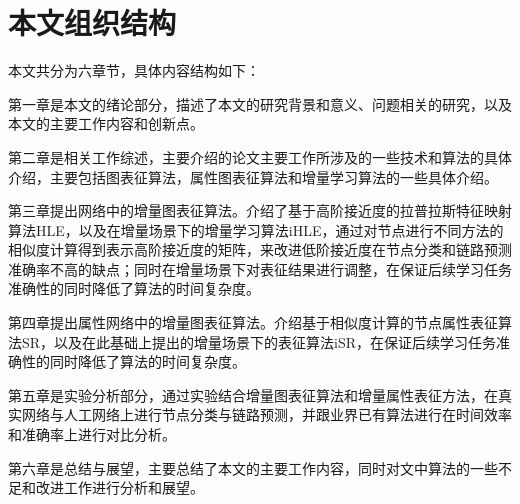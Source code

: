 \section{本文组织结构}

本文共分为六章节，具体内容结构如下：

第一章是本文的绪论部分，描述了本文的研究背景和意义、问题相关的研究，以及本文的主要工作内容和创新点。

第二章是相关工作综述，主要介绍的论文主要工作所涉及的一些技术和算法的具体介绍，主要包括图表征算法，属性图表征算法和增量学习算法的一些具体介绍。

第三章提出网络中的增量图表征算法。介绍了基于高阶接近度的拉普拉斯特征映射算法HLE，以及在增量场景下的增量学习算法iHLE，通过对节点进行不同方法的相似度计算得到表示高阶接近度的矩阵，来改进低阶接近度在节点分类和链路预测准确率不高的缺点；同时在增量场景下对表征结果进行调整，在保证后续学习任务准确性的同时降低了算法的时间复杂度。

第四章提出属性网络中的增量图表征算法。介绍基于相似度计算的节点属性表征算法SR，以及在此基础上提出的增量场景下的表征算法iSR，在保证后续学习任务准确性的同时降低了算法的时间复杂度。

第五章是实验分析部分，通过实验结合增量图表征算法和增量属性表征方法，在真实网络与人工网络上进行节点分类与链路预测，并跟业界已有算法进行在时间效率和准确率上进行对比分析。

第六章是总结与展望，主要总结了本文的主要工作内容，同时对文中算法的一些不足和改进工作进行分析和展望。
